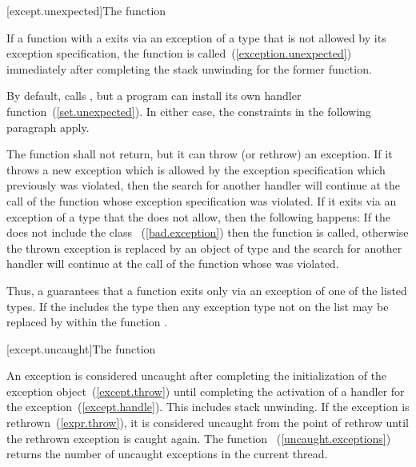 [except.unexpected]{The  function}

\pnum
{}%
If a function with
a 
exits via an exception
of a type that is not allowed by its exception specification,
the function
is called~(\ref{exception.unexpected}) immediately after completing
the stack unwinding for the former function.

\pnum
\begin{note} By default,  calls , but a
program can install its own handler function~(\ref{set.unexpected}). In either case, the
constraints in the following paragraph apply. \end{note}

\pnum
The
function shall not return, but it can throw (or rethrow) an exception.
If it throws a new exception which is allowed by the exception specification
which previously was violated, then the search for another handler
will continue at the call of the function whose exception specification was violated.
If it exits via an exception of a type that the
does not allow,
then the following happens:
%
If the
does not include the class
~(\ref{bad.exception})
then the function
is called, otherwise the thrown exception is replaced by an
object of type
and the search for another handler will continue at the call of the function
whose
was violated.

\pnum
\begin{note}
Thus,
a 
guarantees that a function exits only via an exception of one of the listed types.
If the
includes the type
then any exception type not on the list may be replaced by
within the function
.
\end{note}

[except.uncaught]{The  function}%

\pnum
An exception is considered uncaught
after completing the initialization of the exception object~(\ref{except.throw})
until completing the activation of a handler for the exception~(\ref{except.handle}).
This includes stack unwinding.
If the exception is rethrown~(\ref{expr.throw}),
it is considered uncaught from the point of rethrow
until the rethrown exception is caught again.
The function ~(\ref{uncaught.exceptions})
returns the number of uncaught exceptions in the current thread.%

